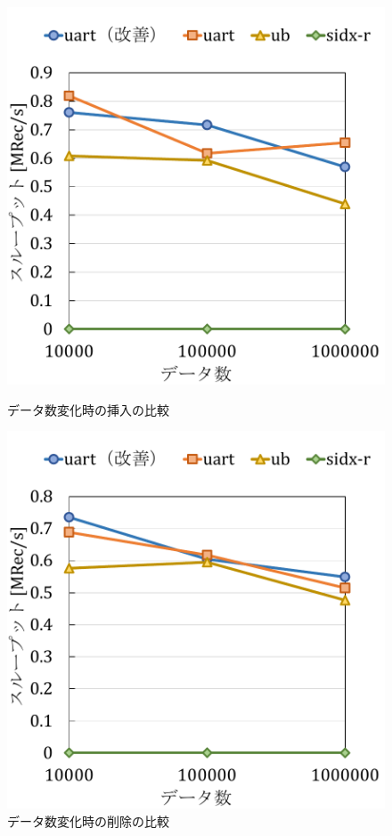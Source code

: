 \begin{figure}[tb]
  \begin{minipage}[c]{0.495\textwidth}
    \centering
    \includegraphics[scale=0.5]{./figures/graph-record-update-8-0.pdf}
    \caption{データ数変化時の挿入の比較}
    \label{graph:grouped}
  \end{minipage}
  \begin{minipage}[c]{0.495\textwidth}
    \centering
    \includegraphics[scale=0.5]{./figures/graph-record-update-8-0.5.pdf}
    \caption{データ数変化時の削除の比較}
    \label{graph:paired}
  \end{minipage}
\end{figure}

